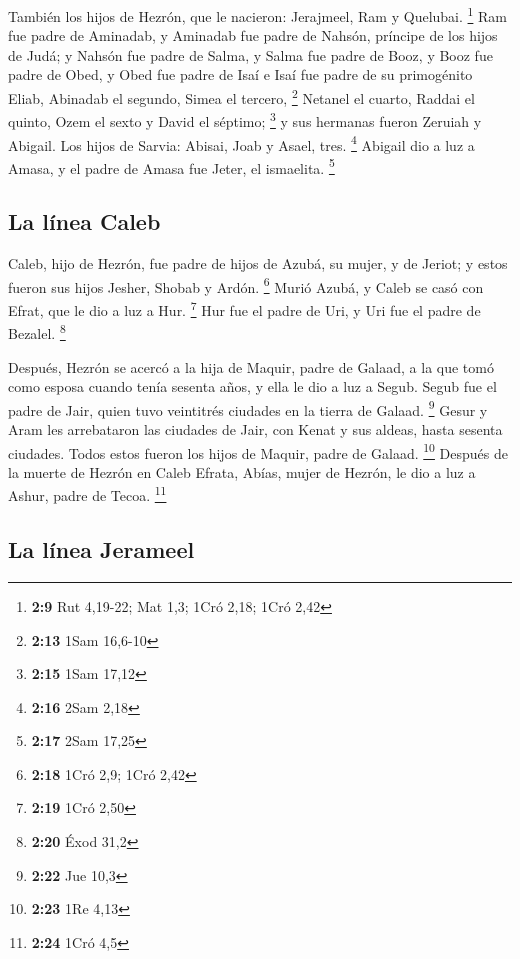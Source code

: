  También los hijos de Hezrón, que le nacieron: Jerajmeel,
Ram y Quelubai. \footnote{\textbf{2:9} Rut 4,19-22; Mat 1,3; 1Cró 2,18;
  1Cró 2,42}  Ram fue padre de Aminadab, y Aminadab fue
padre de Nahsón, príncipe de los hijos de Judá;  y Nahsón
fue padre de Salma, y Salma fue padre de Booz,  y Booz
fue padre de Obed, y Obed fue padre de Isaí  e Isaí fue
padre de su primogénito Eliab, Abinadab el segundo, Simea el tercero,
\footnote{\textbf{2:13} 1Sam 16,6-10}  Netanel el cuarto,
Raddai el quinto,  Ozem el sexto y David el séptimo;
\footnote{\textbf{2:15} 1Sam 17,12}  y sus hermanas
fueron Zeruiah y Abigail. Los hijos de Sarvia: Abisai, Joab y Asael,
tres. \footnote{\textbf{2:16} 2Sam 2,18}  Abigail dio a
luz a Amasa, y el padre de Amasa fue Jeter, el ismaelita. \footnote{\textbf{2:17}
  2Sam 17,25}

\hypertarget{la-luxednea-caleb}{%
\subsection{La línea Caleb}\label{la-luxednea-caleb}}

 Caleb, hijo de Hezrón, fue padre de hijos de Azubá, su
mujer, y de Jeriot; y estos fueron sus hijos Jesher, Shobab y Ardón.
\footnote{\textbf{2:18} 1Cró 2,9; 1Cró 2,42}  Murió
Azubá, y Caleb se casó con Efrat, que le dio a luz a Hur. \footnote{\textbf{2:19}
  1Cró 2,50}  Hur fue el padre de Uri, y Uri fue el padre
de Bezalel. \footnote{\textbf{2:20} Éxod 31,2}

 Después, Hezrón se acercó a la hija de Maquir, padre de
Galaad, a la que tomó como esposa cuando tenía sesenta años, y ella le
dio a luz a Segub.  Segub fue el padre de Jair, quien
tuvo veintitrés ciudades en la tierra de Galaad. \footnote{\textbf{2:22}
  Jue 10,3}  Gesur y Aram les arrebataron las ciudades de
Jair, con Kenat y sus aldeas, hasta sesenta ciudades. Todos estos fueron
los hijos de Maquir, padre de Galaad. \footnote{\textbf{2:23} 1Re 4,13}
 Después de la muerte de Hezrón en Caleb Efrata, Abías,
mujer de Hezrón, le dio a luz a Ashur, padre de Tecoa. \footnote{\textbf{2:24}
  1Cró 4,5}

\hypertarget{la-luxednea-jerameel}{%
\subsection{La línea Jerameel}\label{la-luxednea-jerameel}}

